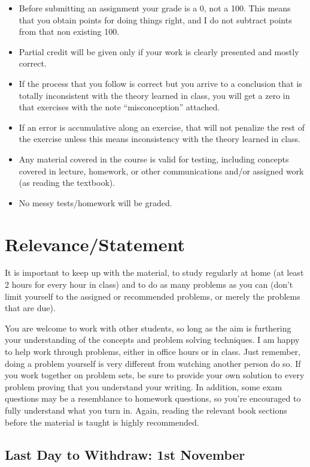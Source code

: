 \documentclass[12pt]{article}
\begin{document}
\begin{itemize}
\item Before submitting an assignment your grade is a 0, not a 100. This means that you obtain points for doing things right, and I do not subtract points from 
that non existing 100. 
\item Partial credit will be given only if your work is clearly presented and mostly correct.
\item If the process that you follow is correct but you arrive to a conclusion that is totally inconsistent with the theory learned in class, you will get a zero
 in that exercises with the note “misconception” attached. 
\item If an error is accumulative along an exercise, that will not penalize the rest of the exercise unless this means inconsistency with the theory learned in 
class. 
\item Any material covered in the course is valid for testing, including concepts covered in lecture, homework, or other communications and/or assigned work 
(as reading the textbook).
\item No messy tests/homework will be graded.
\end{itemize}

\section*{Relevance/Statement}

It is important to keep up with the material, to study regularly at home (at least 2 hours for every hour in class) and to do as many problems as you can 
(don’t limit yourself to the assigned or recommended problems, or merely the problems that are due).  

	You are welcome to work with other students, so long as the aim is furthering your understanding of the concepts and problem solving techniques. I am 
	happy to help work through problems, either in office hours or in class. Just remember, doing a problem yourself is very different from watching another 
	person do so. If you work together on problem sets, be sure to provide your own solution to every problem proving that you understand your writing. 
	In addition, some exam questions may be a resemblance to homework questions, so you’re encouraged to fully understand what you turn in. 
	Again, reading the relevant book sections before the material is taught is highly recommended. 


\subsection*{Last Day to Withdraw:    1st November}
\end{document}

